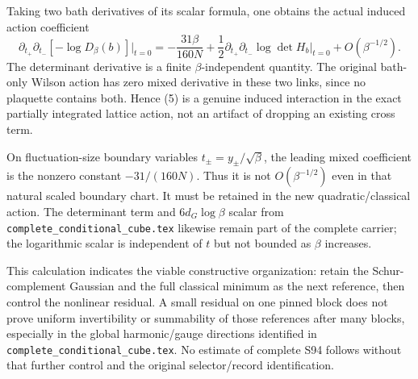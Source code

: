 \documentclass{article}
\begin{document}
Taking two bath derivatives of its scalar formula, one obtains the actual induced action coefficient
\[
 \partial_{t_+}\partial_{t_-}[-\log D_\beta(b)]\big|_{t=0}
 =-\frac{31\beta}{160N}
 +\frac12\partial_{t_+}\partial_{t_-}\log\det H_b\big|_{t=0}
 +O(\beta^{-1/2}).
 \tag{5}
\]
The determinant derivative is a finite $\beta$-independent quantity. The original bath-only Wilson action has zero mixed derivative in these two links, since no plaquette contains both. Hence (5) is a genuine induced interaction in the exact partially integrated lattice action, not an artifact of dropping an existing cross term.

On fluctuation-size boundary variables $t_\pm=y_\pm/\sqrt\beta$, the leading mixed coefficient is the nonzero constant $-31/(160N)$. Thus it is not $O(\beta^{-1/2})$ even in that natural scaled boundary chart. It must be retained in the new quadratic/classical action. The determinant term and $6d_G\log\beta$ scalar from \texttt{complete\_conditional\_cube.tex} likewise remain part of the complete carrier; the logarithmic scalar is independent of $t$ but not bounded as $\beta$ increases.

This calculation indicates the viable constructive organization: retain the Schur-complement Gaussian and the full classical minimum as the next reference, then control the nonlinear residual. A small residual on one pinned block does not prove uniform invertibility or summability of those references after many blocks, especially in the global harmonic/gauge directions identified in \texttt{complete\_conditional\_cube.tex}. No estimate of complete S94 follows without that further control and the original selector/record identification.
\end{document}
